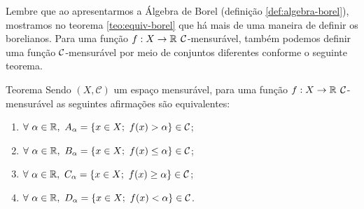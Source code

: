     Lembre que ao apresentarmos a Álgebra de Borel (definição \ref{def:algebra-borel}), mostramos no teorema \ref{teo:equiv-borel} que há mais de uma maneira de definir os borelianos.
    Para uma função $f: X \to \mathbb{R}$ $\operatorname{\mathcal{C}}$-mensurável, também podemos definir uma função $\operatorname{\mathcal{C}}$-mensurável por meio de conjuntos diferentes conforme o seguinte teorema.

\begin{resultado}{Teorema}
\label{teo:equiv-funcoes-mensuraveis}
    Sendo $(X,\mathcal{C})$ um espaço mensurável, para uma função $f: X \to \mathbb{R}$ $\operatorname{\mathcal{C}}$-mensurável as seguintes afirmações são equivalentes:
    \begin{multicols}{2}
        
    \begin{enumerate}[label=(\alph*)]
        \item $\forall \ \alpha \in \mathbb{R}, \ A_\alpha =\{x \in X;\ f(x) > \alpha \} \in \mathcal{C}$;
        \item $\forall \ \alpha \in \mathbb{R}, \ B_\alpha =\{x \in X;\ f(x) \leq \alpha \} \in \mathcal{C}$;
        \item $\forall \ \alpha \in \mathbb{R}, \ C_\alpha =\{x \in X;\ f(x) \geq \alpha \} \in \mathcal{C}$;
        \item $\forall \ \alpha \in \mathbb{R}, \ D_\alpha =\{x \in X;\ f(x) < \alpha \} \in \mathcal{C}$.
    \end{enumerate}
     \end{multicols}

\end{resultado}

